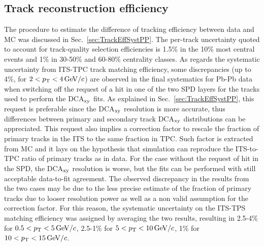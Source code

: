 \subsection{Track reconstruction efficiency}
\label{sec:TrackEffSystPbPb}
The procedure to estimate the difference
of tracking efficiency between data and MC was discussed in Sec.~\ref{sec:TrackEffSystPP}.
The per-track uncertainty quoted to account for track-quality selection efficiencies
is 1.5\% in the 10\% most central events and 1\% in 30-50\% and 60-80\% 
centrality classes. As regards the systematic uncertainty from ITS-TPC track
matching efficiency, some discrepancies (up to 4\%, for $2 < p_{\rm T} < 4\, \mathrm{GeV}/c$) 
are observed in the final systematics for Pb-Pb data
when switching off the request of a hit in one of the two SPD 
layers for the tracks used to perform the DCA$_{\rm xy}$ fits.
As explained in Sec.~\ref{sec:TrackEffSystPP}, this request is 
preferable since the DCA$_{\rm xy}$
resolution is more accurate, thus differences between primary and secondary track DCA$_{\rm xy}$ 
distributions can be appreciated. This request also implies 
a correction factor to rescale the fraction of primary tracks in the ITS
to the same fraction in TPC. Such factor is extracted from MC and it
lays on the hypothesis that simulation can reproduce the ITS-to-TPC ratio of primary tracks 
as in data. For the case 
without the request of hit in the SPD, the DCA$_{\rm xy}$
resolution is worse, but the fits can be performed with still acceptable data-to-fit agreement.
The observed discrepancy in the results from the two cases 
may be due to the less precise estimate
of the fraction of primary tracks due to looser resolution power as well as
a non valid assumption for the correction factor. For this reason, the systematic 
uncertainty on the ITS-TPS matching efficiency was
assigned by averaging the two results, resulting in
2.5-4\% for $0.5 < p_{\rm T} < 5 \, \mathrm{GeV}/c$, 2.5-1\% for $5 < p_{\rm T} < 10 \, \mathrm{GeV}/c$, 1\% for $10 < p_{\rm T} < 15\, \mathrm{GeV}/c$.


